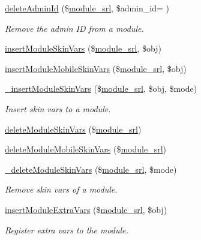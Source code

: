 \begin{DoxyCompactItemize}
\hyperlink{classmoduleController_a3ba07d8a726a5f1d869480fa61a60487}{delete\+Admin\+Id} (\$\hyperlink{ko_8install_8php_a370bb6450fab1da3e0ed9f484a38b761}{module\+\_\+srl}, \$admin\+\_\+id= \textquotesingle{}\textquotesingle{})
\begin{DoxyCompactList}\small\item\em Remove the admin I\+D from a module. \end{DoxyCompactList}\item 
\hyperlink{classmoduleController_ad044df4dde2053b5dcbaf5077822290c}{insert\+Module\+Skin\+Vars} (\$\hyperlink{ko_8install_8php_a370bb6450fab1da3e0ed9f484a38b761}{module\+\_\+srl}, \$obj)
\item 
\hyperlink{classmoduleController_a6c7aab59734028d1c980053a75437a45}{insert\+Module\+Mobile\+Skin\+Vars} (\$\hyperlink{ko_8install_8php_a370bb6450fab1da3e0ed9f484a38b761}{module\+\_\+srl}, \$obj)
\item 
\hyperlink{classmoduleController_aea2dfb4f6a1d31acdbebf131058494cd}{\+\_\+insert\+Module\+Skin\+Vars} (\$\hyperlink{ko_8install_8php_a370bb6450fab1da3e0ed9f484a38b761}{module\+\_\+srl}, \$obj, \$mode)
\begin{DoxyCompactList}\small\item\em Insert skin vars to a module. \end{DoxyCompactList}\item 
\hyperlink{classmoduleController_ad85915b5cf2a31804f673cfc3320ac75}{delete\+Module\+Skin\+Vars} (\$\hyperlink{ko_8install_8php_a370bb6450fab1da3e0ed9f484a38b761}{module\+\_\+srl})
\item 
\hyperlink{classmoduleController_a16feed706aef2613cc417c68cb06ba8a}{delete\+Module\+Mobile\+Skin\+Vars} (\$\hyperlink{ko_8install_8php_a370bb6450fab1da3e0ed9f484a38b761}{module\+\_\+srl})
\item 
\hyperlink{classmoduleController_a88baeaa3755f270af223e17e7a96d20a}{\+\_\+delete\+Module\+Skin\+Vars} (\$\hyperlink{ko_8install_8php_a370bb6450fab1da3e0ed9f484a38b761}{module\+\_\+srl}, \$mode)
\begin{DoxyCompactList}\small\item\em Remove skin vars of a module. \end{DoxyCompactList}\item 
\hyperlink{classmoduleController_a1a8373bfcd3e1e8bc88f41bb777ad486}{insert\+Module\+Extra\+Vars} (\$\hyperlink{ko_8install_8php_a370bb6450fab1da3e0ed9f484a38b761}{module\+\_\+srl}, \$obj)
\begin{DoxyCompactList}\small\item\em Register extra vars to the module. \end{DoxyCompactList}\item 

\end{DoxyCompactItemize}
